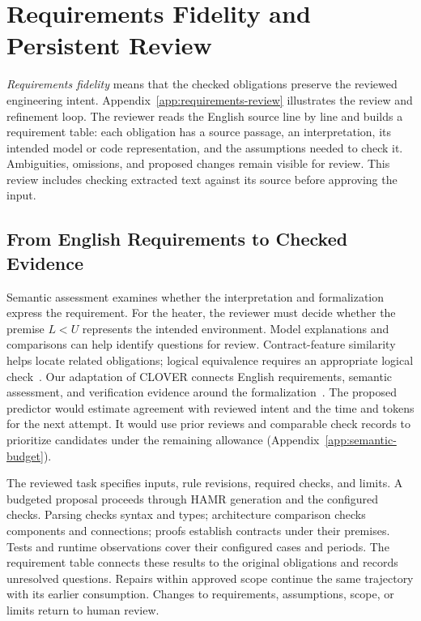 \section{Requirements Fidelity and Persistent Review}
\label{sec:fidelity}
\label{sec:requirements-workflow}

\emph{Requirements fidelity} means that the checked obligations preserve the reviewed engineering intent. Appendix~\ref{app:requirements-review} illustrates the review and refinement loop. The reviewer reads the English source line by line and builds a requirement table: each obligation has a source passage, an interpretation, its intended model or code representation, and the assumptions needed to check it. Ambiguities, omissions, and proposed changes remain visible for review. This review includes checking extracted text against its source before approving the input.

\subsection{From English Requirements to Checked Evidence}
Semantic assessment examines whether the interpretation and formalization express the requirement. For the heater, the reviewer must decide whether the premise $L<U$ represents the intended environment. Model explanations and comparisons can help identify questions for review. Contract-feature similarity helps locate related obligations; logical equivalence requires an appropriate logical check~\cite{bayless2025arc,tahat2026scp}. Our adaptation of CLOVER connects English requirements, semantic assessment, and verification evidence around the formalization~\cite{sun2024clover}. The proposed predictor would estimate agreement with reviewed intent and the time and tokens for the next attempt. It would use prior reviews and comparable check records to prioritize candidates under the remaining allowance (Appendix~\ref{app:semantic-budget}).

The reviewed task specifies inputs, rule revisions, required checks, and limits. A budgeted proposal proceeds through HAMR generation and the configured checks. Parsing checks syntax and types; architecture comparison checks components and connections; proofs establish contracts under their premises. Tests and runtime observations cover their configured cases and periods. The requirement table connects these results to the original obligations and records unresolved questions. Repairs within approved scope continue the same trajectory with its earlier consumption. Changes to requirements, assumptions, scope, or limits return to human review.

